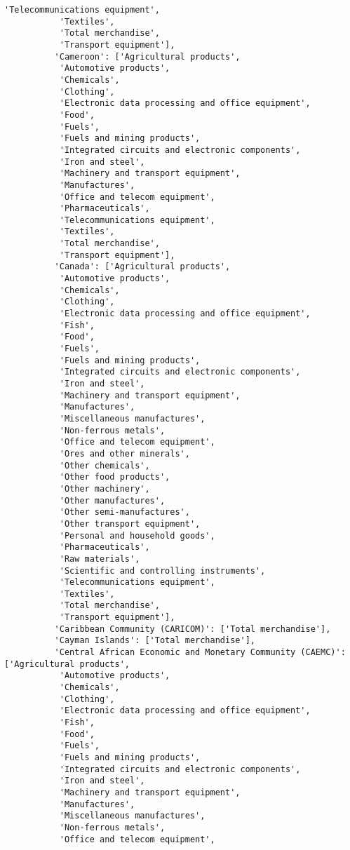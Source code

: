\documentclass[11pt]{article}
\begin{document}
\begin{Verbatim}[commandchars=\\\{\}]
           'Telecommunications equipment',
           'Textiles',
           'Total merchandise',
           'Transport equipment'],
          'Cameroon': ['Agricultural products',
           'Automotive products',
           'Chemicals',
           'Clothing',
           'Electronic data processing and office equipment',
           'Food',
           'Fuels',
           'Fuels and mining products',
           'Integrated circuits and electronic components',
           'Iron and steel',
           'Machinery and transport equipment',
           'Manufactures',
           'Office and telecom equipment',
           'Pharmaceuticals',
           'Telecommunications equipment',
           'Textiles',
           'Total merchandise',
           'Transport equipment'],
          'Canada': ['Agricultural products',
           'Automotive products',
           'Chemicals',
           'Clothing',
           'Electronic data processing and office equipment',
           'Fish',
           'Food',
           'Fuels',
           'Fuels and mining products',
           'Integrated circuits and electronic components',
           'Iron and steel',
           'Machinery and transport equipment',
           'Manufactures',
           'Miscellaneous manufactures',
           'Non-ferrous metals',
           'Office and telecom equipment',
           'Ores and other minerals',
           'Other chemicals',
           'Other food products',
           'Other machinery',
           'Other manufactures',
           'Other semi-manufactures',
           'Other transport equipment',
           'Personal and household goods',
           'Pharmaceuticals',
           'Raw materials',
           'Scientific and controlling instruments',
           'Telecommunications equipment',
           'Textiles',
           'Total merchandise',
           'Transport equipment'],
          'Caribbean Community (CARICOM)': ['Total merchandise'],
          'Cayman Islands': ['Total merchandise'],
          'Central African Economic and Monetary Community (CAEMC)': ['Agricultural products',
           'Automotive products',
           'Chemicals',
           'Clothing',
           'Electronic data processing and office equipment',
           'Fish',
           'Food',
           'Fuels',
           'Fuels and mining products',
           'Integrated circuits and electronic components',
           'Iron and steel',
           'Machinery and transport equipment',
           'Manufactures',
           'Miscellaneous manufactures',
           'Non-ferrous metals',
           'Office and telecom equipment',

\end{Verbatim}
\end{document}

